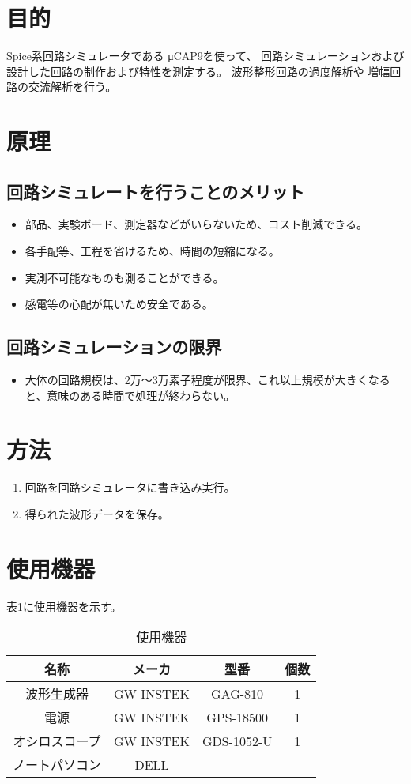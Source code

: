 \documentclass{jsarticle}
\begin{document}


\section{目的}
Spice系回路シミュレータである
μCAP9を使って、
回路シミュレーションおよび
設計した回路の制作および特性を測定する。
波形整形回路の過度解析や
増幅回路の交流解析を行う。

\section{原理}
\subsection{回路シミュレートを行うことのメリット}
\begin{itemize}
				\item 部品、実験ボード、測定器などがいらないため、コスト削減できる。
				\item 各手配等、工程を省けるため、時間の短縮になる。
				\item 実測不可能なものも測ることができる。
				\item 感電等の心配が無いため安全である。
\end{itemize}

\subsection{回路シミュレーションの限界}
\begin{itemize}
				\item 大体の回路規模は、2万〜3万素子程度が限界、これ以上規模が大きくなると、意味のある時間で処理が終わらない。
\end{itemize}

\section{方法}
\begin{enumerate}
				\item 回路を回路シミュレータに書き込み実行。
				\item 得られた波形データを保存。
\end{enumerate}

\section{使用機器}
表\ref{use}に使用機器を示す。
\begin{table}[htbp]
		\centering
		\caption{使用機器}
		\label{use}
		\begin{tabular}{|c|c|c|c|}\hline
				名称&メーカ&型番&個数 \\ \hline
				波形生成器&GW INSTEK&GAG-810&1 \\ \hline
				電源&GW INSTEK&GPS-18500&1 \\ \hline
				オシロスコープ&GW INSTEK&GDS-1052-U&1 \\ \hline
				ノートパソコン&DELL&& \\ \hline
		\end{tabular}
\end{table}
\end{document}
